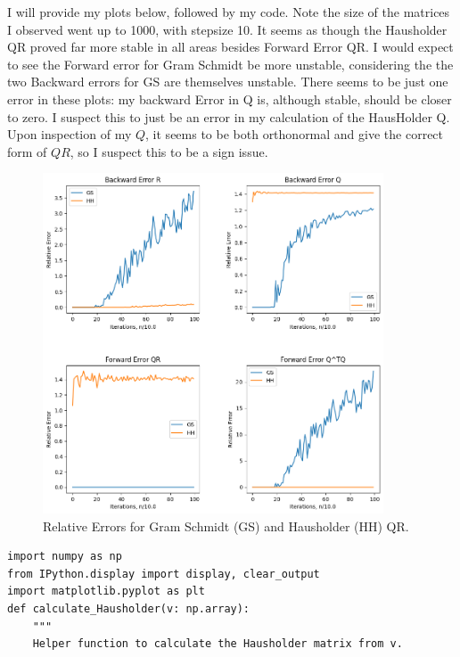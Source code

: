 \partbreak
\begin{solution}

    I will provide my plots below, followed by my code. Note the size of the matrices I observed went up to 1000, with stepsize 10. It seems as though the Hausholder QR proved far more stable in all areas besides Forward Error QR. I would expect to see the Forward error for Gram Schmidt be more unstable, considering the the two Backward errors for GS are themselves unstable. There seems to be just one error in these plots: my backward Error in Q is, although stable, should be closer to zero. I suspect this to just be an error in my calculation of the HausHolder Q. Upon inspection of my $Q$, it seems to be both orthonormal and give the correct form of $QR$, so I suspect this to be a sign issue.

    \begin{figure}[ht]
        \centering
        \includegraphics[width = 0.9\textwidth]{Images/problem6d MC3.png}
        \caption{Relative Errors for Gram Schmidt (GS) and Hausholder (HH) QR.}
        \label{fig:p6d rel err}
    \end{figure}

\clearpage
\begin{lstlisting}
import numpy as np
from IPython.display import display, clear_output
import matplotlib.pyplot as plt
def calculate_Hausholder(v: np.array):
    """
    Helper function to calculate the Hausholder matrix from v.
    

\end{lstlisting}
\end{solution}
